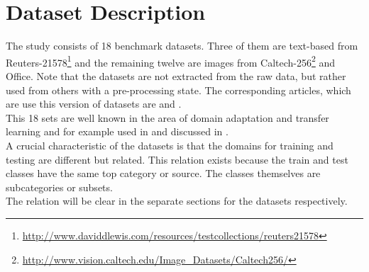 \section{Dataset Description}\label{EmSecDaDes}
The study consists of 18 benchmark datasets.
Three of them are text-based from Reuters-21578\footnote{\url{http://www.daviddlewis.com/resources/testcollections/reuters21578}} and the remaining twelve are images from Caltech-256\footnote{\url{http://www.vision.caltech.edu/Image\_Datasets/Caltech256/}} and Office.
Note that the datasets are not extracted from the raw data, but rather used from others with a pre-processing state.
The corresponding articles, which are use this version of datasets are \cite{Gong.} and \cite{Long.2015}.
\\
This 18 sets are well known in the area of domain adaptation and transfer learning and for example used in 
\cite{Long.2015}\cite{Gong.}\cite{Fernando.}\cite{Long.}\cite{Dai.}\cite{Quattoni.} and discussed in \cite{Pan.2010}.\\
A crucial characteristic of the datasets is that the domains for training and testing are different but related.
This relation exists because the train and test classes have the same top category or source.
The classes themselves are subcategories or subsets.\cite{JingGao.2008}\\
The relation will be clear in the separate sections for the datasets respectively.

